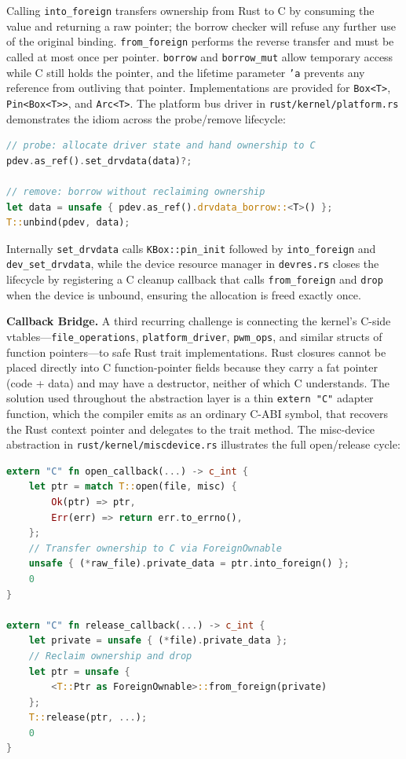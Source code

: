 \noindent
Calling \texttt{into\_foreign} transfers ownership from Rust to C by consuming the value and
returning a raw pointer; the borrow checker will refuse any further use of the original binding.
\texttt{from\_foreign} performs the reverse transfer and must be called at most once per pointer.
\texttt{borrow} and \texttt{borrow\_mut} allow temporary access while C still holds the pointer,
and the lifetime parameter \texttt{'a} prevents any reference from outliving that pointer.
Implementations are provided for \texttt{Box<T>}, \texttt{Pin<Box<T>>}, and \texttt{Arc<T>}.
The platform bus driver in \texttt{rust/kernel/platform.rs} demonstrates the idiom across the
probe/remove lifecycle:

\begin{lstlisting}[language=Rust,columns=fullflexible]
// probe: allocate driver state and hand ownership to C
pdev.as_ref().set_drvdata(data)?;

// remove: borrow without reclaiming ownership
let data = unsafe { pdev.as_ref().drvdata_borrow::<T>() };
T::unbind(pdev, data);
\end{lstlisting}

\noindent
Internally \texttt{set\_drvdata} calls \texttt{KBox::pin\_init} followed by
\texttt{into\_foreign} and \texttt{dev\_set\_drvdata}, while the device resource manager in
\texttt{devres.rs} closes the lifecycle by registering a C cleanup callback that calls
\texttt{from\_foreign} and \texttt{drop} when the device is unbound, ensuring the allocation is
freed exactly once.

\textbf{Callback Bridge.}
A third recurring challenge is connecting the kernel's C-side vtables---\texttt{file\_operations},
\texttt{platform\_driver}, \texttt{pwm\_ops}, and similar structs of function pointers---to safe
Rust trait implementations.
Rust closures cannot be placed directly into C function-pointer fields because they carry a fat
pointer (code + data) and may have a destructor, neither of which C understands.
The solution used throughout the abstraction layer is a thin \texttt{extern "C"} adapter function,
which the compiler emits as an ordinary C-ABI symbol, that recovers the Rust context pointer and
delegates to the trait method.
The misc-device abstraction in \texttt{rust/kernel/miscdevice.rs} illustrates the full
open/release cycle:

\begin{lstlisting}[language=Rust,columns=fullflexible]
extern "C" fn open_callback(...) -> c_int {
    let ptr = match T::open(file, misc) {
        Ok(ptr) => ptr,
        Err(err) => return err.to_errno(),
    };
    // Transfer ownership to C via ForeignOwnable
    unsafe { (*raw_file).private_data = ptr.into_foreign() };
    0
}

extern "C" fn release_callback(...) -> c_int {
    let private = unsafe { (*file).private_data };
    // Reclaim ownership and drop
    let ptr = unsafe {
        <T::Ptr as ForeignOwnable>::from_foreign(private)
    };
    T::release(ptr, ...);
    0
}
\end{lstlisting}

